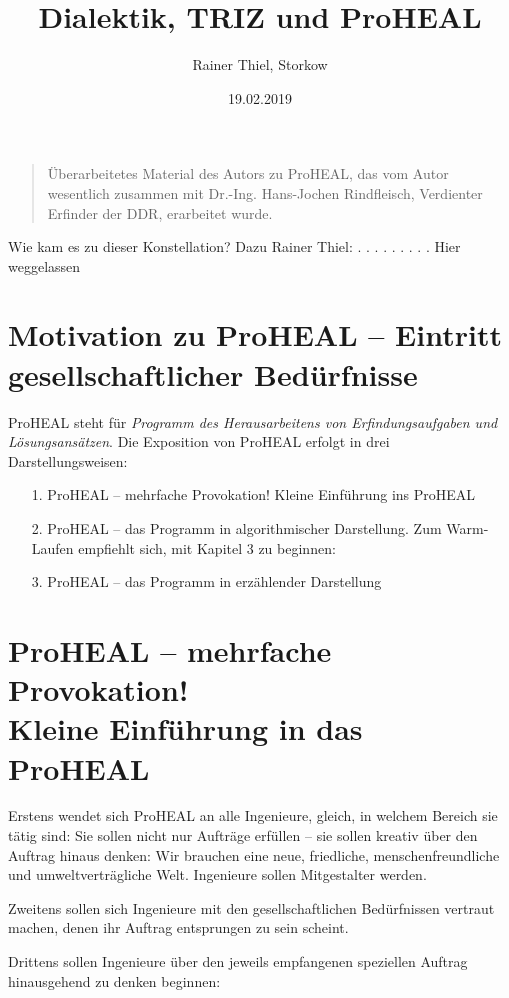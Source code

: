 \documentclass[12pt,a4paper]{article}
\title{Dialektik, TRIZ und ProHEAL}
\author{Rainer Thiel, Storkow}
\date{19.02.2019}
\begin{document}
\maketitle
\begin{quote}
  Überarbeitetes Material des Autors zu ProHEAL, das vom Autor wesentlich
  zusammen mit Dr.-Ing. Hans-Jochen Rindfleisch, Verdienter Erfinder der DDR,
  erarbeitet wurde.
\end{quote}
\tableofcontents
\newpage

Wie kam es zu dieser Konstellation?
Dazu Rainer Thiel: . . . . . . . . . Hier weggelassen

\section*{Motivation zu ProHEAL -- Eintritt gesellschaftlicher Bedürfnisse}

ProHEAL steht für \emph{Programm des Herausarbeitens von Erfindungsaufgaben und
  Lösungs\-ansätzen}. Die Exposition von ProHEAL erfolgt in drei
Darstellungsweisen:
\begin{itemize}
\item [1.] ProHEAL – mehrfache Provokation! Kleine Einführung ins ProHEAL
\item [2.] ProHEAL – das Programm in algorithmischer Darstellung. Zum
  Warm-Laufen empfiehlt sich, mit Kapitel 3 zu beginnen:
\item [3.] ProHEAL – das Programm in erzählender Darstellung
\end{itemize}

\section{ProHEAL – mehrfache Provokation!\\ Kleine Einführung in das ProHEAL}

Erstens wendet sich ProHEAL an alle Ingenieure, gleich, in welchem Bereich sie
tätig sind: Sie sollen nicht nur Aufträge erfüllen – sie sollen kreativ über
den Auftrag hinaus denken: Wir brauchen eine neue, friedliche,
menschenfreundliche und umweltverträgliche Welt. Ingenieure sollen Mitgestalter
werden.

Zweitens sollen sich Ingenieure mit den gesellschaftlichen Bedürfnissen
vertraut machen, denen ihr Auftrag entsprungen zu sein scheint.

Drittens sollen Ingenieure über den jeweils empfangenen speziellen Auftrag
hinausgehend zu denken beginnen:
\end{document}
